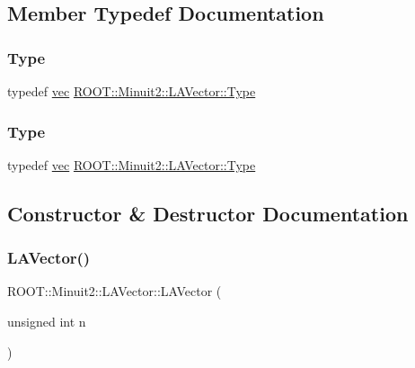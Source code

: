 \subsection{Member Typedef Documentation}
\mbox{\label{classROOT_1_1Minuit2_1_1LAVector_a3ca6d24ac34f5e322623ac131e090f20}} 
\subsubsection{\texorpdfstring{Type}{Type}\hspace{0.1cm}{\footnotesize\ttfamily [1/2]}}
{\footnotesize\ttfamily typedef \mbox{\hyperlink{classROOT_1_1Minuit2_1_1vec}{vec}} \mbox{\hyperlink{classROOT_1_1Minuit2_1_1LAVector_a3ca6d24ac34f5e322623ac131e090f20}{R\+O\+O\+T\+::\+Minuit2\+::\+L\+A\+Vector\+::\+Type}}}

\mbox{\label{classROOT_1_1Minuit2_1_1LAVector_a3ca6d24ac34f5e322623ac131e090f20}} 
\subsubsection{\texorpdfstring{Type}{Type}\hspace{0.1cm}{\footnotesize\ttfamily [2/2]}}
{\footnotesize\ttfamily typedef \mbox{\hyperlink{classROOT_1_1Minuit2_1_1vec}{vec}} \mbox{\hyperlink{classROOT_1_1Minuit2_1_1LAVector_a3ca6d24ac34f5e322623ac131e090f20}{R\+O\+O\+T\+::\+Minuit2\+::\+L\+A\+Vector\+::\+Type}}}



\subsection{Constructor \& Destructor Documentation}
\mbox{\label{classROOT_1_1Minuit2_1_1LAVector_a3dca313e27f716415056d248bd05cf1f}} 
\subsubsection{\texorpdfstring{LAVector()}{LAVector()}\hspace{0.1cm}{\footnotesize\ttfamily [1/16]}}
{\footnotesize\ttfamily R\+O\+O\+T\+::\+Minuit2\+::\+L\+A\+Vector\+::\+L\+A\+Vector (\begin{DoxyParamCaption}\item[{unsigned int}]{n }\end{DoxyParamCaption})\hspace{0.3cm}{\ttfamily [inline]}}

